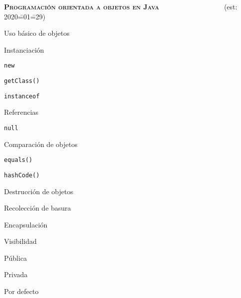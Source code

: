 \begin{longenum}
\begin{longenum}
    \end{longenum}
    \item \textbf{\textsc{Programación orientada a objetos en Java}} \ \ \ \ \ \ \ \ \ \ \ \ \ \ \ \ \ \ (est: 2020\==01\==29)
    \begin{longenum}
        \item Uso básico de objetos
        \begin{longenum}
            \item Instanciación
            \begin{longenum}
                \item \texttt{new}
                \item \texttt{getClass()}
                \item \texttt{instanceof}
            \end{longenum}
            \item Referencias
            \begin{longenum}
                \item \texttt{null}
            \end{longenum}
            \item Comparación de objetos
            \begin{longenum}
                \item \texttt{equals()}
                \item \texttt{hashCode()}
            \end{longenum}
            \item Destrucción de objetos
            \begin{longenum}
                \item Recolección de basura
            \end{longenum}
        \end{longenum}
        \item Encapsulación
        \begin{longenum}
            \item Visibilidad
            \begin{longenum}
                \item Pública
                \item Privada
                \item Por defecto
            \end{longenum}
        \end{longenum}

\end{longenum}
\end{longenum}
